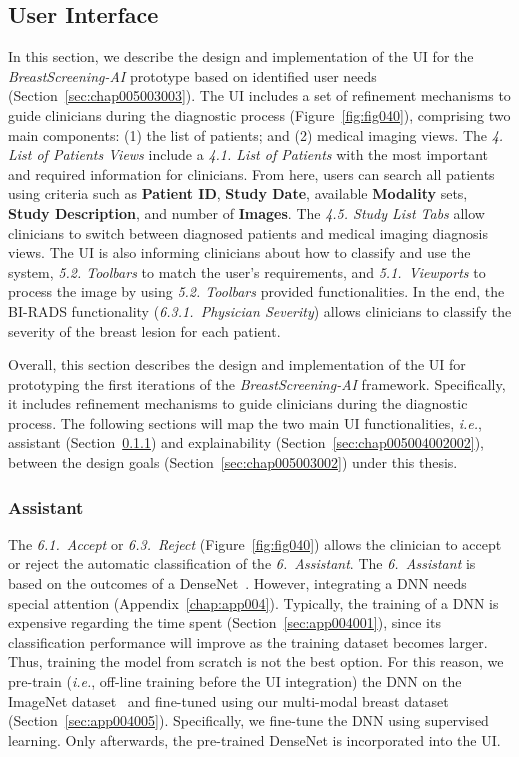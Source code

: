 \subsection{User Interface}
\label{sec:chap005004002}

In this section, we describe the design and implementation of the \ac{UI} for the {\it BreastScreening-AI} prototype based on identified user needs (Section~\ref{sec:chap005003003}).
The \ac{UI} includes a set of refinement mechanisms to guide clinicians during the diagnostic process (Figure~\ref{fig:fig040}), comprising two main components:
(1) the list of patients; and
(2) medical imaging views.
The {\it 4. List of Patients Views} include a {\it 4.1. List of Patients} with the most important and required information for clinicians.
From here, users can search all patients using criteria such as {\bf Patient ID}, {\bf Study Date}, available {\bf Modality} sets, {\bf Study Description}, and number of {\bf Images}.
The {\it 4.5. Study List Tabs} allow clinicians to switch between diagnosed patients and medical imaging diagnosis views.
The \ac{UI} is also informing clinicians about how to classify and use the system, {\it 5.2. Toolbars} to match the user's requirements, and {\it 5.1.~Viewports} to process the image by using {\it 5.2. Toolbars} provided functionalities.
In the end, the \ac{BI-RADS} functionality ({\it 6.3.1.~Physician Severity}) allows clinicians to classify the severity of the breast lesion for each patient.

Overall, this section describes the design and implementation of the \ac{UI} for prototyping the first iterations of the {\it BreastScreening-AI} framework.
Specifically, it includes refinement mechanisms to guide clinicians during the diagnostic process.
The following sections will map the two main \ac{UI} functionalities, {\it i.e.}, assistant (Section~\ref{sec:chap005004002001}) and explainability (Section~\ref{sec:chap005004002002}), between the design goals (Section~\ref{sec:chap005003002}) under this thesis.

\subsubsection{Assistant}
\label{sec:chap005004002001}

The {\it 6.1.~Accept} or {\it 6.3.~Reject} (Figure~\ref{fig:fig040}) allows the clinician to accept or reject the automatic classification of the {\it 6.~Assistant}.
The {\it 6.~Assistant} is based on the outcomes of a DenseNet~\cite{Huang_2017_CVPR}.
However, integrating a \ac{DNN} needs special attention (Appendix~\ref{chap:app004}).
Typically, the training of a \ac{DNN} is expensive regarding the time spent (Section~\ref{sec:app004001}), since its classification performance will improve as the training dataset becomes larger.
Thus, training the model from scratch is not the best option.
For this reason, we pre-train ({\it i.e.}, off-line training before the \ac{UI} integration) the \ac{DNN} on the ImageNet dataset~\cite{10.1145/3351095.3375709} and fine-tuned using our multi-modal breast dataset (Section~\ref{sec:app004005}).
Specifically, we fine-tune the \ac{DNN} using supervised learning.
Only afterwards, the pre-trained DenseNet is incorporated into the \ac{UI}.

